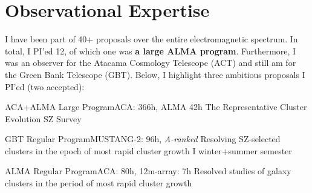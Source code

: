 
\section{Observational Expertise}

I have been part of 40+ proposals over the entire electromagnetic spectrum. In total, I PI'ed 12, of which one was \textbf{a large ALMA program}. Furthermore, I was an observer for the Atacama Cosmology Telescope (ACT) and still am for the Green Bank Telescope (GBT). Below, I highlight three ambitious proposals I PI'ed (two accepted):

\resumeSubHeadingListStart

    \resumeSubheading
      {ACA+ALMA Large Program}{ACA: 366h, ALMA 42h}
      {The Representative Cluster Evolution SZ Survey}{}
        \resumeItemListStart
        \resumeItemListEnd

    \resumeSubheading
      {GBT Regular Program}{MUSTANG-2: 96h, \textit{A-ranked}}
      {Resolving SZ-selected clusters in the epoch of most rapid cluster growth I}{ winter+summer semester}
        \resumeItemListStart
        \resumeItemListEnd

    \resumeSubheading
      {ALMA Regular Program}{ACA: 80h, 12m-array: 7h}
      {Resolved studies of galaxy clusters in the period of most rapid cluster growth}{}
        \resumeItemListStart
        \resumeItemListEnd

  \resumeSubHeadingListEnd
